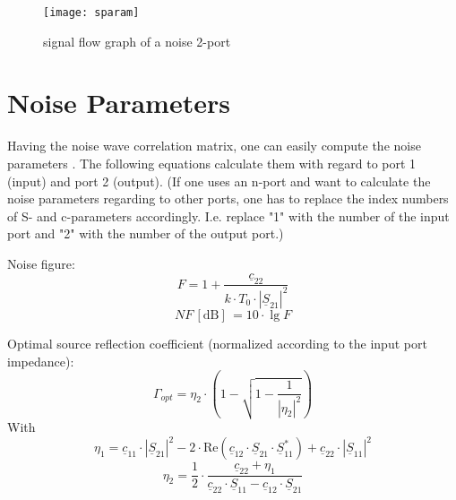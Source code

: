 \begin{figure}[ht]
\begin{center}
\texttt{[image: sparam]}
\end{center}
\caption{signal flow graph of a noise 2-port}
\label{fig:Sparam}
\end{figure}
\FloatBarrier


\section{Noise Parameters}

Having the noise wave correlation matrix, one can easily compute the
noise parameters \cite{Wedge}.  The following equations calculate them
with regard to port 1 (input) and port 2 (output).  (If one uses an
n-port and want to calculate the noise parameters regarding to other
ports, one has to replace the index numbers of S- and c-parameters
accordingly.  I.e. replace "1" with the number of the input port and
"2" with the number of the output port.)

\addvspace{12pt}

Noise figure:
\begin{equation}
F = 1 + \frac{\underline{c}_{22}}{k\cdot T_0\cdot |\underline{S}_{21}|^2}
\label{eq:nparamF}
\end{equation}
\begin{equation}
NF\,[\text{dB}]\, = 10\cdot\lg F
\end{equation}

\addvspace{12pt}

Optimal source reflection coefficient (normalized according to the input
port impedance):
\begin{equation}
\Gamma_{opt} = \eta_2\cdot\left( 1-\sqrt{1-\frac{1}{|\eta_2|^2}} \right)
\end{equation}
With
\begin{equation}
\eta_1 = \underline{c}_{11}\cdot |\underline{S}_{21}|^2
       - 2\cdot \text{Re}\left(\underline{c}_{12}\cdot\underline{S}_{21}\cdot\underline{S}_{11}^*\right)
       + \underline{c}_{22}\cdot|\underline{S}_{11}|^2
\end{equation}
\begin{equation}
\eta_2 = \frac{1}{2}\cdot\frac{\underline{c}_{22} + \eta_1}
              {\underline{c}_{22}\cdot\underline{S}_{11} - \underline{c}_{12}\cdot\underline{S}_{21}}
\end{equation}

\addvspace{12pt}

